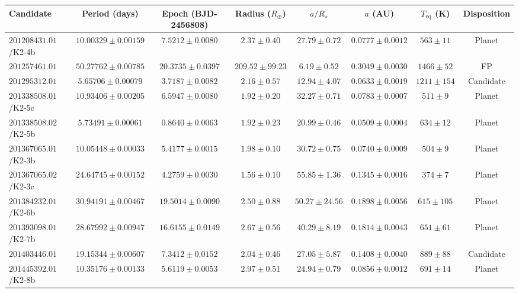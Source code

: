 \begin{landscape}
\begin{table}[hbt!]
\tiny
\begin{center}
\begin{tabular}{lccccccc}
\hline
Candidate & Period (days) & Epoch (BJD-2456808) & Radius ($R_\oplus$) & $a/R_\star$ & $a$ (AU) & $T_\mathrm{eq}$ (K) &
Disposition \\
\hline
$201208431.01$/K2-4b & $10.00329 \pm {0.00159}$ & $7.5212 \pm {0.0080}$ & $2.37 \pm {0.40}$ & $27.79 \pm {0.72}$ & $0.0777 \pm {0.0012}$ & $563 \pm {11} $     & Planet\\
$201257461.01$ & $50.27762 \pm {0.00785}$ & $20.3735 \pm {0.0397}$ & $209.52 \pm {99.23}$ & $6.19 \pm {0.52}$ & $0.3049 \pm {0.0030}$ & $1466 \pm {52} $ & FP \\
$201295312.01$ & $5.65706 \pm {0.00079}$ & $3.7187 \pm {0.0082}$ & $2.16 \pm {0.57}$ & $12.94 \pm {4.07}$ & $0.0633 \pm {0.0019}$ & $1211 \pm {154} $    & Candidate \\
$201338508.01$/K2-5c & $10.93406 \pm {0.00205}$ & $6.5947 \pm {0.0080}$ & $1.92 \pm {0.20}$ & $32.27 \pm {0.71}$ & $0.0783 \pm {0.0007}$ & $511 \pm {9} $      & Planet \\
$201338508.02$/K2-5b & $5.73491 \pm {0.00061}$ & $0.8640 \pm {0.0063}$ & $1.92 \pm {0.23}$ & $20.99 \pm {0.46}$ & $0.0509 \pm {0.0004}$ & $634 \pm {12} $      & Planet \\
$201367065.01$/K2-3b & $10.05448 \pm {0.00033}$ & $5.4177 \pm {0.0015}$ & $1.98 \pm {0.10}$ & $30.72 \pm {0.75}$ & $0.0740 \pm {0.0009}$ & $504 \pm {9} $      & Planet \\
$201367065.02$/K2-3c & $24.64745 \pm {0.00152}$ & $4.2759 \pm {0.0030}$ & $1.56 \pm {0.10}$ & $55.85 \pm {1.36}$ & $0.1345 \pm {0.0016}$ & $374 \pm {7} $      & Planet \\
$201384232.01$/K2-6b & $30.94191 \pm {0.00467}$ & $19.5014 \pm {0.0090}$ & $2.50 \pm {0.88}$ & $50.27 \pm {24.56}$ & $0.1898 \pm {0.0056}$ & $615 \pm {105} $  & Planet \\
$201393098.01$/K2-7b & $28.67992 \pm {0.00947}$ & $16.6155 \pm {0.0149}$ & $2.67 \pm {0.56}$ & $40.29 \pm {8.19}$ & $0.1814 \pm {0.0043}$ & $651 \pm {61} $    & Planet \\
$201403446.01$ & $19.15344 \pm {0.00607}$ & $7.3412 \pm {0.0152}$ & $2.04 \pm {0.46}$ & $27.05 \pm {5.87}$ & $0.1408 \pm {0.0040}$ & $889 \pm {88} $     & Candidate \\
$201445392.01$/K2-8b & $10.35176 \pm {0.00133}$ & $5.6119 \pm {0.0053}$ & $2.97 \pm {0.51}$ & $24.94 \pm {0.79}$ & $0.0856 \pm {0.0012}$ & $691 \pm {14} $     & Planet \\

\end{tabular}
\end{center}
\end{table}
\end{landscape}
